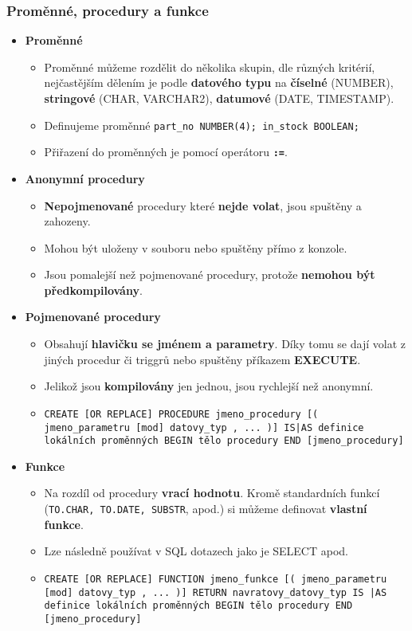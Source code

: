 \subsubsection{Proměnné, procedury a funkce}
\begin{itemize}
	\item \textbf{Proměnné}
\begin{itemize}
\item Proměnné můžeme rozdělit do několika skupin, dle různých kritérií, nejčastějším dělením je podle \textbf{datového typu} na \textbf{číselné} (NUMBER), \textbf{stringové} (CHAR, VARCHAR2), \textbf{datumové} (DATE, TIMESTAMP).
\item Definujeme proměnné \texttt{part\_no NUMBER(4); in\_stock BOOLEAN;}
\item Přiřazení do proměnných je pomocí operátoru \textbf{\texttt{:=}}.
\end{itemize}

\item \textbf{Anonymní procedury}
\begin{itemize}
\item \textbf{Nepojmenované} procedury které \textbf{nejde volat}, jsou spuštěny a zahozeny.
\item Mohou být uloženy v souboru nebo spuštěny přímo z konzole.
\item Jsou pomalejší než pojmenované procedury, protože \textbf{nemohou být předkompilovány}.
\end{itemize}

\item \textbf{Pojmenované procedury}
\begin{itemize}
\item Obsahují \textbf{hlavičku se jménem a parametry}. Díky tomu se dají volat z jiných procedur či triggrů nebo spuštěny příkazem \textbf{EXECUTE}.
\item Jelikož jsou \textbf{kompilovány} jen jednou, jsou rychlejší než anonymní.
\item \texttt{CREATE [OR REPLACE] PROCEDURE jmeno\_procedury [( jmeno\_parametru [mod] datovy\_typ , ... )] IS|AS definice lokálních proměnných BEGIN tělo procedury END [jmeno\_procedury]}
\end{itemize}

\item \textbf{Funkce}
\begin{itemize}
\item Na rozdíl od procedury \textbf{vrací hodnotu}. Kromě standardních funkcí (\texttt{TO.CHAR, TO.DATE, SUBSTR}, apod.) si můžeme definovat \textbf{vlastní funkce}.
\item Lze následně používat v SQL dotazech jako je SELECT apod.
\item \texttt{CREATE [OR REPLACE] FUNCTION jmeno\_funkce [( jmeno\_parametru [mod] datovy\_typ , ... )] RETURN navratovy\_datovy\_typ IS |AS definice lokálních proměnných BEGIN tělo procedury END [jmeno\_procedury]}
\end{itemize}
\end{itemize}

